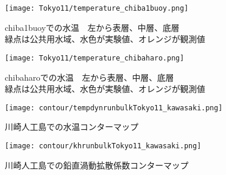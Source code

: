 \documentclass[fontsize=12pt,paper=a4]{jlreq}
\begin{document}
\begin{figure}[hbtp]
  \centering
  \texttt{[image: Tokyo11/temperature\_chiba1buoy.png]}
  \caption{chiba1buoyでの水温　左から表層、中層、底層\\緑点は公共用水域、水色が実験値、オレンジが観測値}
\end{figure}

\begin{figure}[hbtp]
  \centering
  \texttt{[image: Tokyo11/temperature\_chibaharo.png]}
  \caption{chibaharoでの水温　左から表層、中層、底層\\緑点は公共用水域、水色が実験値、オレンジが観測値}
\end{figure}


\begin{figure}[hbtp]
    \centering
    \texttt{[image: contour/tempdynrunbulkTokyo11\_kawasaki.png]}
    \caption{川崎人工島での水温コンターマップ}
\end{figure}


\begin{figure}[hbtp]
  \centering
  \texttt{[image: contour/khrunbulkTokyo11\_kawasaki.png]}
  \caption{川崎人工島での鉛直渦動拡散係数コンターマップ}
\end{figure}
\end{document}
